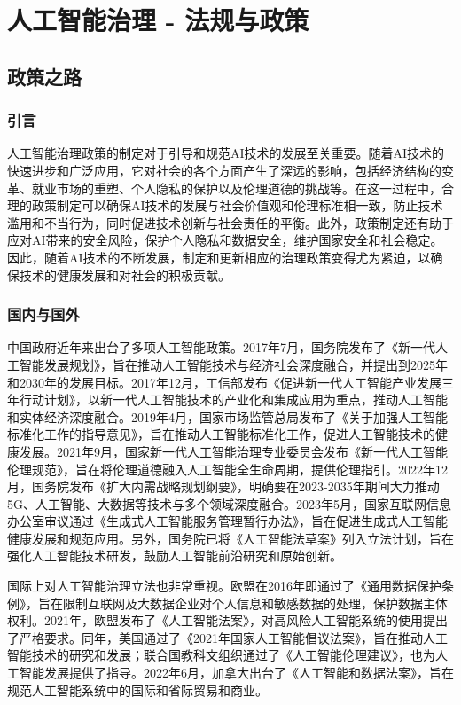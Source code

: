 \setchapterpreamble[u]{\margintoc}
\chapter{人工智能治理 - 法规与政策}

\section{政策之路}
\subsection{引言}
人工智能治理政策的制定对于引导和规范AI技术的发展至关重要。随着AI技术的快速进步和广泛应用，它对社会的各个方面产生了深远的影响，包括经济结构的变革、就业市场的重塑、个人隐私的保护以及伦理道德的挑战等。在这一过程中，合理的政策制定可以确保AI技术的发展与社会价值观和伦理标准相一致，防止技术滥用和不当行为，同时促进技术创新与社会责任的平衡。此外，政策制定还有助于应对AI带来的安全风险，保护个人隐私和数据安全，维护国家安全和社会稳定。因此，随着AI技术的不断发展，制定和更新相应的治理政策变得尤为紧迫，以确保技术的健康发展和对社会的积极贡献。

\subsection{国内与国外}
中国政府近年来出台了多项⼈⼯智能政策。2017年7⽉，国务院发布了《新⼀代⼈⼯智能发展规划》，旨在推动人工智能技术与经济社会深度融合，并提出到2025年和2030年的发展目标。2017年12月，工信部发布《促进新一代人工智能产业发展三年行动计划》，以新一代人工智能技术的产业化和集成应用为重点，推动人工智能和实体经济深度融合。2019年4⽉，国家市场监管总局发布了《关于加强⼈⼯智能标准化⼯作的指导意⻅》，旨在推动⼈⼯智能标准化⼯作，促进⼈⼯智能技术的健康发展。2021年9月，国家新一代人工智能治理专业委员会发布《新一代人工智能伦理规范》，旨在将伦理道德融入人工智能全生命周期，提供伦理指引。2022年12月，国务院发布《扩大内需战略规划纲要》，明确要在2023-2035年期间大力推动5G、人工智能、大数据等技术与多个领域深度融合。2023年5月，国家互联网信息办公室审议通过《生成式人工智能服务管理暂行办法》，旨在促进生成式人工智能健康发展和规范应用。另外，国务院已将《人工智能法草案》列入立法计划，旨在强化人工智能技术研发，鼓励人工智能前沿研究和原始创新。

国际上对人工智能治理立法也非常重视。欧盟在2016年即通过了《通用数据保护条例》，旨在限制互联网及大数据企业对个人信息和敏感数据的处理，保护数据主体权利。2021年，欧盟发布了《人工智能法案》，对高风险人工智能系统的使用提出了严格要求。同年，美国通过了《2021年国家人工智能倡议法案》，旨在推动人工智能技术的研究和发展；联合国教科文组织通过了《人工智能伦理建议》，也为人工智能发展提供了指导。2022年6月，加拿大出台了《人工智能和数据法案》，旨在规范人工智能系统中的国际和省际贸易和商业。

